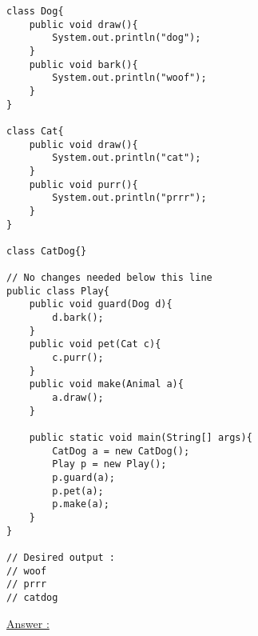 \documentclass{article}
\begin{document}
\begin{enumerate}
\begin{lstlisting}
class Dog{
	public void draw(){
		System.out.println("dog");
	}
	public void bark(){
		System.out.println("woof");
	}
}

class Cat{
	public void draw(){
		System.out.println("cat");
	}
	public void purr(){
		System.out.println("prrr");
	}
}

class CatDog{}

// No changes needed below this line
public class Play{
	public void guard(Dog d){
		d.bark();
	}
	public void pet(Cat c){
		c.purr();
	}
	public void make(Animal a){
		a.draw();
	}
	
	public static void main(String[] args){
		CatDog a = new CatDog();
		Play p = new Play();
		p.guard(a);
		p.pet(a);
		p.make(a);
	}
}

// Desired output :
// woof
// prrr
// catdog
	\end{lstlisting}
\end{enumerate}
\newpage
\underline{Answer :}
\end{document}
